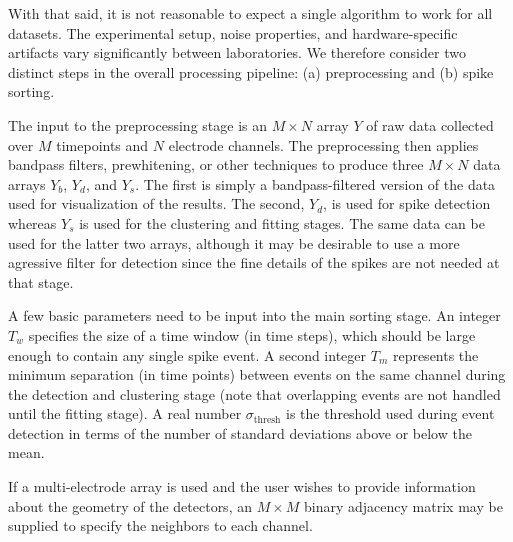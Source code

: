 \documentclass[10pt]{article}
\begin{document}
With that said, it is not reasonable to expect a single algorithm to work for all datasets. The experimental setup, noise properties, and hardware-specific artifacts vary significantly between laboratories. We therefore consider two distinct steps in the overall processing pipeline: (a) preprocessing and (b) spike sorting. 

The input to the preprocessing stage is an $M\times N$ array $Y$ of raw data collected over $M$ timepoints and $N$ electrode channels. The preprocessing then applies bandpass filters, prewhitening, or other techniques to produce three $M\times N$ data arrays $Y_b$, $Y_d$, and $Y_s$. The first is simply a bandpass-filtered version of the data used for visualization of the results. The second, $Y_d$, is used for spike detection whereas $Y_s$ is used for the clustering and fitting stages. The same data can be used for the latter two arrays, although it may be desirable to use a more agressive filter for detection since the fine details of the spikes are not needed at that stage.

A few basic parameters need to be input into the main sorting stage. An integer $T_w$ specifies the size of a time window (in time steps), which should be large enough to contain any single spike event. A second integer $T_m$ represents the minimum separation (in time points) between events on the same channel during the detection and clustering stage (note that overlapping events are not handled until the fitting stage). A real number $\sigma_\text{thresh}$ is the threshold used during event detection in terms of the number of standard deviations above or below the mean.

If a multi-electrode array is used and the user wishes to provide information about the geometry of the detectors, an $M\times M$ binary adjacency matrix may be supplied to specify the neighbors to each channel.
\end{document}
